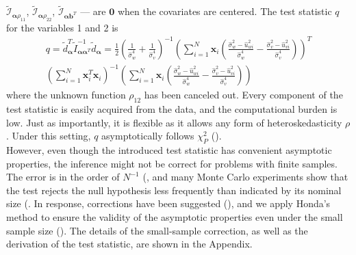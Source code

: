 \documentclass[aap,authoryear, preprint]{imsart}
\numberwithin{equation}{section}
\theoremstyle{plain}
\begin{document}
$\tilde{\mathcal{I}}_{\bm{\alpha}\rho_{11}}$,
$\tilde{\mathcal{I}}_{\bm{\alpha}\rho_{22}}$,
$\tilde{\mathcal{I}}_{\bm{\alpha}\bm{b}^T}$ --- are $\bm{0}$ when the covariates are centered. The test statistic $q$ for the variables 1 and 2 is
\begin{equation}
    \begin{multlined}
    q = \tilde{d}_{\bm{\alpha}}^T \tilde{I}_{\bm{\alpha}\bm{\alpha}^T}^{-1}
    \tilde{d}_{\bm{\alpha}}
    =\frac{1}{2}\left( \frac{1}{\hat{\sigma}_w^4}+\frac{1}{\hat{\sigma}_v^4}\right)^{-1}
\left(\sum_{i=1}^{N} \bm{x}_{i} 
\left(
\frac{\hat{\sigma}_w^2-\hat{u}_{wi}^2}{\hat{\sigma}_w^4}- \frac{\hat{\sigma}_v^2-\hat{u}_{vi}^2}{\hat{\sigma}_v^4}
\right)
\right)^T \\
\left( \sum_{i=1}^{N} \bm{x}_i^T \bm{x}_i \right)^{-1}
\left(
\sum_{i=1}^{N} \bm{x}_{i} 
\left(
\frac{\hat{\sigma}_w^2-\hat{u}_{wi}^2}{\hat{\sigma}_w^4}- \frac{\hat{\sigma}_v^2-\hat{u}_{vi}^2}{\hat{\sigma}_v^4}
\right)
\right)
    \end{multlined}
    \label{eq:q}
\end{equation}
where the unknown function $\rho_{12}$ has been canceled out. Every component of the test statistic is easily acquired from the data, and the computational burden is low. Just as importantly, it is flexible as it allows any form of heteroskedasticity $\rho$. Under this setting, $q$ asymptotically follows $\chi_{P}^2$ (\cite{breusch1979simple}).\\

However, even though the introduced test statistic has convenient asymptotic properties, the inference might not be correct for problems with finite samples. The error is in the order of $N^{-1}$ (\cite{harris1985asymptotic}, and many Monte Carlo experiments show that the test rejects the null hypothesis less frequently than indicated by its nominal size (\cite{ godfrey1978testing, griffiths1986monte}. In response, corrections have been suggested (\cite{cribari2001monotonic, harris1985asymptotic}), and we apply Honda's method to ensure the validity of the asymptotic properties even under the small sample size (\cite{honda1988size}). The details of the small-sample correction, as well as the derivation of the test statistic, are shown in the Appendix.\\
\end{document}
